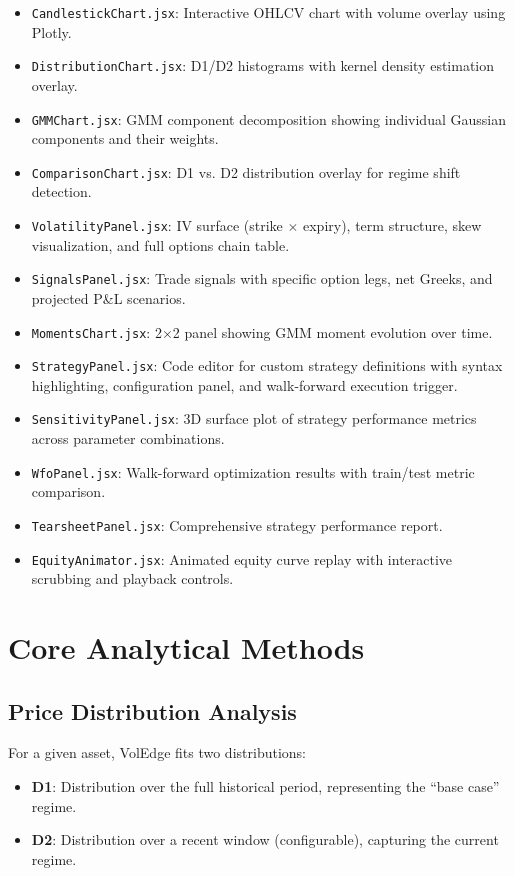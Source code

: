 \documentclass[11pt]{article}
\begin{document}
\begin{itemize}[nosep]
    \item \texttt{CandlestickChart.jsx}: Interactive OHLCV chart with volume overlay using Plotly.
    \item \texttt{DistributionChart.jsx}: D1/D2 histograms with kernel density estimation overlay.
    \item \texttt{GMMChart.jsx}: GMM component decomposition showing individual Gaussian components and their weights.
    \item \texttt{ComparisonChart.jsx}: D1 vs. D2 distribution overlay for regime shift detection.
    \item \texttt{VolatilityPanel.jsx}: IV surface (strike $\times$ expiry), term structure, skew visualization, and full options chain table.
    \item \texttt{SignalsPanel.jsx}: Trade signals with specific option legs, net Greeks, and projected P\&L scenarios.
    \item \texttt{MomentsChart.jsx}: 2$\times$2 panel showing GMM moment evolution over time.
    \item \texttt{StrategyPanel.jsx}: Code editor for custom strategy definitions with syntax highlighting, configuration panel, and walk-forward execution trigger.
    \item \texttt{SensitivityPanel.jsx}: 3D surface plot of strategy performance metrics across parameter combinations.
    \item \texttt{WfoPanel.jsx}: Walk-forward optimization results with train/test metric comparison.
    \item \texttt{TearsheetPanel.jsx}: Comprehensive strategy performance report.
    \item \texttt{EquityAnimator.jsx}: Animated equity curve replay with interactive scrubbing and playback controls.
\end{itemize}

\section{Core Analytical Methods}

\subsection{Price Distribution Analysis}

For a given asset, VolEdge fits two distributions:
\begin{itemize}[nosep]
    \item \textbf{D1}: Distribution over the full historical period, representing the ``base case'' regime.
    \item \textbf{D2}: Distribution over a recent window (configurable), capturing the current regime.
\end{itemize}
\end{document}
